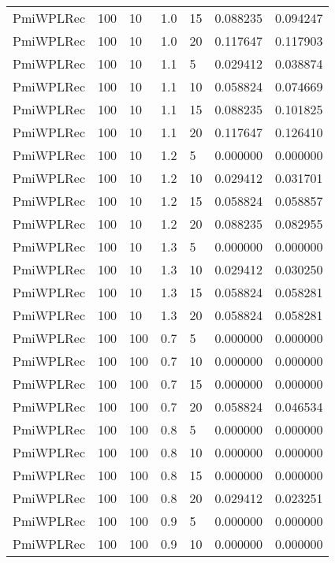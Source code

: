 \begin{tabular}{lllrlrr}
 PmiWPLRec &  100 &    10 &   1.0 &   15 &     0.088235 &  0.094247 \\
 PmiWPLRec &  100 &    10 &   1.0 &   20 &     0.117647 &  0.117903 \\
 PmiWPLRec &  100 &    10 &   1.1 &    5 &     0.029412 &  0.038874 \\
 PmiWPLRec &  100 &    10 &   1.1 &   10 &     0.058824 &  0.074669 \\
 PmiWPLRec &  100 &    10 &   1.1 &   15 &     0.088235 &  0.101825 \\
 PmiWPLRec &  100 &    10 &   1.1 &   20 &     0.117647 &  0.126410 \\
 PmiWPLRec &  100 &    10 &   1.2 &    5 &     0.000000 &  0.000000 \\
 PmiWPLRec &  100 &    10 &   1.2 &   10 &     0.029412 &  0.031701 \\
 PmiWPLRec &  100 &    10 &   1.2 &   15 &     0.058824 &  0.058857 \\
 PmiWPLRec &  100 &    10 &   1.2 &   20 &     0.088235 &  0.082955 \\
 PmiWPLRec &  100 &    10 &   1.3 &    5 &     0.000000 &  0.000000 \\
 PmiWPLRec &  100 &    10 &   1.3 &   10 &     0.029412 &  0.030250 \\
 PmiWPLRec &  100 &    10 &   1.3 &   15 &     0.058824 &  0.058281 \\
 PmiWPLRec &  100 &    10 &   1.3 &   20 &     0.058824 &  0.058281 \\
 PmiWPLRec &  100 &   100 &   0.7 &    5 &     0.000000 &  0.000000 \\
 PmiWPLRec &  100 &   100 &   0.7 &   10 &     0.000000 &  0.000000 \\
 PmiWPLRec &  100 &   100 &   0.7 &   15 &     0.000000 &  0.000000 \\
 PmiWPLRec &  100 &   100 &   0.7 &   20 &     0.058824 &  0.046534 \\
 PmiWPLRec &  100 &   100 &   0.8 &    5 &     0.000000 &  0.000000 \\
 PmiWPLRec &  100 &   100 &   0.8 &   10 &     0.000000 &  0.000000 \\
 PmiWPLRec &  100 &   100 &   0.8 &   15 &     0.000000 &  0.000000 \\
 PmiWPLRec &  100 &   100 &   0.8 &   20 &     0.029412 &  0.023251 \\
 PmiWPLRec &  100 &   100 &   0.9 &    5 &     0.000000 &  0.000000 \\
 PmiWPLRec &  100 &   100 &   0.9 &   10 &     0.000000 &  0.000000 \\

\end{tabular}
